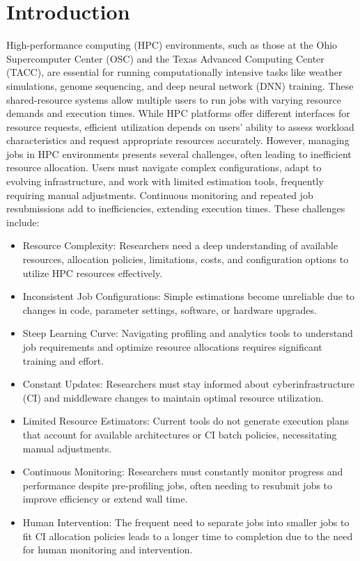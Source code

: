 \chapter{Introduction}
\label{introduction.ch}

High-performance computing (HPC) environments, such as those at the Ohio Supercomputer Center (OSC) and the Texas Advanced Computing Center (TACC), are essential for running computationally intensive tasks like weather simulations, genome sequencing, and deep neural network (DNN) training. These shared-resource systems allow multiple users to run jobs with varying resource demands and execution times. While HPC platforms offer different interfaces for resource requests, efficient utilization depends on users' ability to assess workload characteristics and request appropriate resources accurately.
However, managing jobs in HPC environments presents several challenges, often leading to inefficient resource allocation. Users must navigate complex configurations, adapt to evolving infrastructure, and work with limited estimation tools, frequently requiring manual adjustments. Continuous monitoring and repeated job resubmissions add to inefficiencies, extending execution times. These challenges include:

\begin{itemize}
    \item Resource Complexity: Researchers need a deep understanding of available resources, allocation policies, limitations, costs, and configuration options to utilize HPC resources effectively.
    \item Inconsistent Job Configurations: Simple estimations become unreliable due to changes in code, parameter settings, software, or hardware upgrades.
    \item Steep Learning Curve: Navigating profiling and analytics tools to understand job requirements and optimize resource allocations requires significant training and effort.
    \item Constant Updates: Researchers must stay informed about cyberinfrastructure (CI) and middleware changes to maintain optimal resource utilization.
    \item Limited Resource Estimators: Current tools do not generate execution plans that account for available architectures or CI batch policies, necessitating manual adjustments.
    \item Continuous Monitoring: Researchers must constantly monitor progress and performance despite pre-profiling jobs, often needing to resubmit jobs to improve efficiency or extend wall time.
    \item Human Intervention: The frequent need to separate jobs into smaller jobs to fit CI allocation policies leads to a longer time to completion due to the need for human monitoring and intervention.
\end{itemize}

